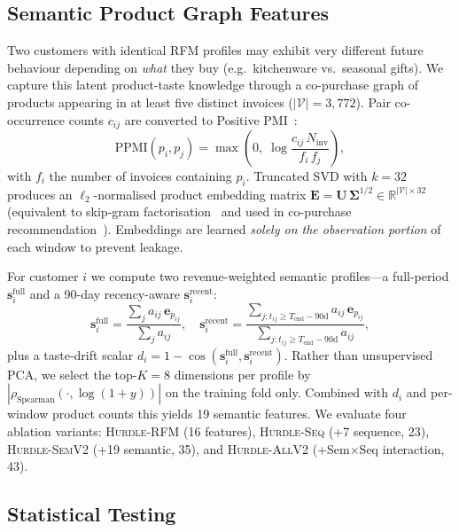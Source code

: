 \documentclass[pdflatex,sn-mathphys-num]{sn-jnl}
\theoremstyle{thmstyleone}
\theoremstyle{thmstyletwo}
\theoremstyle{thmstylethree}
\begin{document}
\subsection{Semantic Product Graph Features}
\label{sec:semantic}

Two customers with identical RFM profiles may exhibit very different
future behaviour depending on \emph{what} they buy (e.g.\ kitchenware
vs.\ seasonal gifts). We capture this latent product-taste knowledge
through a co-purchase graph of products appearing in at least five
distinct invoices ($|\mathcal V|{=}3{,}772$). Pair co-occurrence
counts $c_{ij}$ are converted to Positive PMI~\cite{bullinaria2007extracting}:
\begin{equation}
\text{PPMI}(p_i, p_j) =
\max\!\left(0,\;\log\frac{c_{ij}\,N_\text{inv}}{f_i\,f_j}\right),
\label{eq:ppmi}
\end{equation}
with $f_i$ the number of invoices containing $p_i$. Truncated SVD with
$k{=}32$ produces an $\ell_2$-normalised product embedding matrix
$\mathbf{E} = \mathbf{U}\,\mathbf{\Sigma}^{1/2} \in \mathbb{R}^{|\mathcal V|\times 32}$
(equivalent to skip-gram factorisation~\cite{levy2014neural} and used in
co-purchase recommendation~\cite{linden2003amazon}). Embeddings are
learned \emph{solely on the observation portion} of each window to
prevent leakage.

For customer $i$ we compute two revenue-weighted semantic profiles---a
full-period $\mathbf{s}_i^{\text{full}}$ and a 90-day recency-aware
$\mathbf{s}_i^{\text{recent}}$:
\begin{equation}
\mathbf{s}_i^{\text{full}} =
  \frac{\sum_j a_{ij}\,\mathbf{e}_{p_{ij}}}{\sum_j a_{ij}},
\quad
\mathbf{s}_i^{\text{recent}} =
  \frac{\sum_{j: t_{ij}\geq T_{\text{end}}-90\mathrm{d}}
        a_{ij}\,\mathbf{e}_{p_{ij}}}
       {\sum_{j: t_{ij}\geq T_{\text{end}}-90\mathrm{d}} a_{ij}},
\label{eq:sem}
\end{equation}
plus a taste-drift scalar
$d_i = 1-\cos(\mathbf{s}_i^{\text{full}},\mathbf{s}_i^{\text{recent}})$.
Rather than unsupervised PCA, we select the top-$K{=}8$ dimensions per
profile by $|\rho_{\text{Spearman}}(\cdot,\log(1+y))|$ on the training
fold only. Combined with $d_i$ and per-window product counts this yields
19 semantic features. We evaluate four ablation variants:
\textsc{Hurdle-RFM} (16 features), \textsc{Hurdle-Seq} (+7 sequence,
23), \textsc{Hurdle-SemV2} (+19 semantic, 35), and
\textsc{Hurdle-AllV2} (+Sem$\times$Seq interaction, 43).

\subsection{Statistical Testing}
\end{document}
